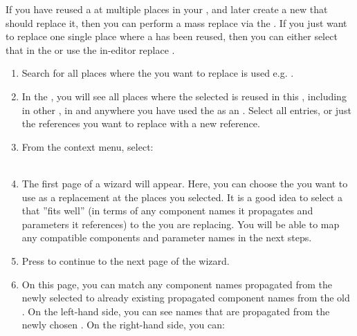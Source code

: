 If you have reused a \gdcase{} at multiple places in your \gdproject{}, and later create a new \gdcase{} that should replace it, then you can perform a mass replace via the \gdsearchresultview{}. If you just want to replace one single place where a  \gdcase{} has been reused, then you can either select that \gdcase{} in the \gdsearchresultview{} or use the in-editor replace .  


\begin{enumerate}
\item Search for all places where the \gdcase{} you want to replace is used e.g.  . 
\item In the \gdsearchresultview{}, you will see all places where the selected \gdcase{} is reused in this \gdproject{}, including in other \gdcases{}, in \gdsuites{} and anywhere you have used the \gdcase{} as an \gdehandler{}. Select all entries, or just the \gdcase{} references you want to replace with a new \gdcase{} reference. 
\item From the context menu, select:\\
\\
\item The first page of a wizard will appear. Here, you can choose the \gdcase{} you want to use as a replacement at the places you selected. It is a good idea to select a \gdcase{} that ''fits well'' (in terms of any component names it propagates and parameters it references) to the \gdcase{} you are replacing. You will be able to map any compatible components and parameter names in the next steps. 
\item Press  to continue to the next page of the wizard.
\item On this page, you can match any component names propagated  from the newly selected \gdcase{} to already existing propagated component names from the old \gdcase{}.    
On the left-hand side, you can see names that are propagated from the newly chosen \gdcase{}. On the right-hand side, you can:

\end{enumerate}
